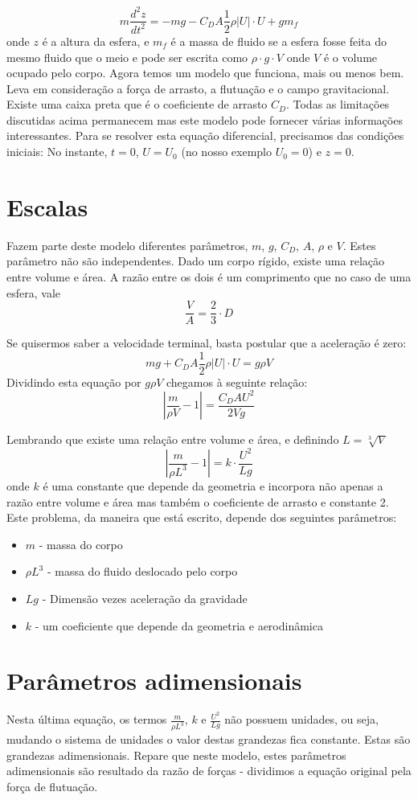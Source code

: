 \[
m \frac{d^2 z}{dt^2} = -mg - C_D A \frac{1}{2} \rho |U|\cdot U + g m_f
\]
onde $z$ é a altura da esfera, e $m_f$ é a massa de fluido se a esfera fosse feita do mesmo fluido que o meio e pode ser escrita como $\rho\cdot g \cdot V$ onde $V$ é o volume ocupado pelo corpo. Agora temos um modelo que funciona, mais ou menos bem. Leva em consideração a força de arrasto, a flutuação e o campo gravitacional. Existe uma caixa preta que é o coeficiente de arrasto $C_D$. Todas as limitações discutidas acima permanecem mas este modelo pode fornecer várias informações interessantes. Para se resolver esta equação diferencial, precisamos das condições iniciais: No instante, $t=0$, $U=U_0$ (no nosso exemplo $U_0 = 0$) e $z=0$.

\section{Escalas}


Fazem parte deste modelo diferentes parâmetros, $m$, $g$, $C_D$, $A$, $\rho$ e  $V$. Estes parâmetro não são independentes. Dado um corpo rígido, existe uma relação entre volume e área. A razão entre os dois é um comprimento que no caso de uma esfera, vale
\[
\frac{V}{A} = \frac{2}{3}\cdot D
\]

Se quisermos saber a velocidade terminal, basta postular que a aceleração é zero:
\[
mg + C_D A \frac{1}{2} \rho |U|\cdot U  = g \rho V
\]
Dividindo esta equação por $g \rho V$ chegamos à seguinte relação:
\[
\left| \frac{m}{\rho V} - 1 \right| = \frac{C_D A U^2}{2 V g}
\]

Lembrando que existe uma relação entre volume e área, e definindo $L = \sqrt[3]{V}$
\[
\left| \frac{m}{\rho L^3} - 1 \right| = k \cdot \frac{U^2}{L g}
\]
onde $k$ é uma constante que depende da geometria e incorpora não apenas a razão entre volume e área mas também o coeficiente de arrasto e constante 2. Este problema, da maneira que está escrito, depende dos seguintes parâmetros:

\begin{itemize}
\item $m$ - massa do corpo
\item $\rho L^3$ - massa do fluido deslocado pelo corpo
\item $Lg$ - Dimensão vezes aceleração da gravidade
\item $k$ - um coeficiente que depende da geometria e aerodinâmica
\end{itemize}

\section{Parâmetros adimensionais}
Nesta última equação, os termos $\frac{m}{\rho L^3}$, $k$ e $\frac{U^2}{L g}$ não possuem unidades, ou seja, mudando o sistema de unidades o valor destas grandezas fica constante. Estas são grandezas adimensionais. Repare que neste modelo, estes parâmetros adimensionais são resultado da razão de forças - dividimos a equação original pela força de flutuação.

